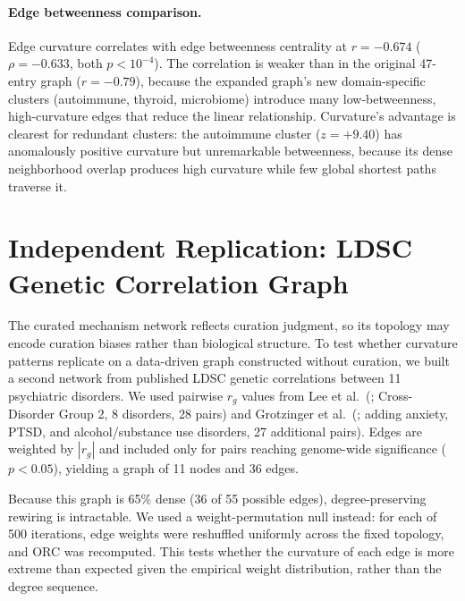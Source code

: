 \documentclass{article}
\begin{document}
\paragraph{Edge betweenness comparison.} Edge curvature correlates with edge betweenness centrality at $r = -0.674$ ($\rho = -0.633$, both $p < 10^{-4}$). The correlation is weaker than in the original 47-entry graph ($r = -0.79$), because the expanded graph's new domain-specific clusters (autoimmune, thyroid, microbiome) introduce many low-betweenness, high-curvature edges that reduce the linear relationship. Curvature's advantage is clearest for redundant clusters: the autoimmune cluster ($z = +9.40$) has anomalously positive curvature but unremarkable betweenness, because its dense neighborhood overlap produces high curvature while few global shortest paths traverse it.

\section{Independent Replication: LDSC Genetic Correlation Graph}
\label{sec:ldsc}

The curated mechanism network reflects curation judgment, so its topology may encode curation biases rather than biological structure. To test whether curvature patterns replicate on a data-driven graph constructed without curation, we built a second network from published LDSC genetic correlations \citep{buliksullivan2015ld} between 11 psychiatric disorders. We used pairwise $r_g$ values from Lee et al.\ (\citeyear{lee2022genetic}; Cross-Disorder Group 2, 8 disorders, 28 pairs) and Grotzinger et al.\ (\citeyear{grotzinger2022genetic}; adding anxiety, PTSD, and alcohol/substance use disorders, 27 additional pairs). Edges are weighted by $|r_g|$ and included only for pairs reaching genome-wide significance ($p < 0.05$), yielding a graph of 11 nodes and 36 edges.

Because this graph is 65\% dense (36 of 55 possible edges), degree-preserving rewiring is intractable. We used a weight-permutation null instead: for each of 500 iterations, edge weights were reshuffled uniformly across the fixed topology, and ORC was recomputed. This tests whether the curvature of each edge is more extreme than expected given the empirical weight distribution, rather than the degree sequence.
\end{document}
